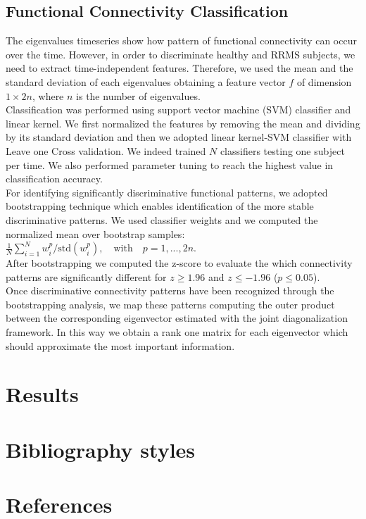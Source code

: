 \documentclass[review]{elsarticle}
\begin{document}
\subsection{Functional Connectivity Classification}
\label{class}
The eigenvalues timeseries show how pattern of functional connectivity can occur over the time. However, in order to discriminate healthy and RRMS subjects, we need to extract time-independent features. Therefore, we used the mean and the standard deviation of each eigenvalues obtaining a feature vector $f$ of dimension $1\times 2n$, where $n$ is the number of eigenvalues.\\
Classification was performed using support vector machine (SVM) classifier and linear kernel. We first normalized the features by removing the mean and dividing by its standard deviation and then we adopted linear kernel-SVM classifier with Leave one Cross validation.
We indeed trained $N$ classifiers testing one subject per time. We also performed parameter tuning to reach the highest value in classification accuracy. \\
For identifying significantly discriminative functional patterns, we adopted bootstrapping technique which enables identification of the more stable discriminative patterns. We used classifier weights and we computed the normalized mean over bootstrap samples: $\frac{1}{N} \sum_{i=1}^N w_i^p/\mbox{std}(w_i^p), \quad \mbox{with} \quad p=1,...,2n$.\\
After bootstrapping we computed the z-score to evaluate the which connectivity patterns are significantly different for $z \ge 1.96$ and $z \le -1.96$ ($p \le 0.05$).\\
Once discriminative connectivity patterns have been recognized through the bootstrapping analysis, we map these patterns computing the outer product between the corresponding eigenvector estimated with the joint diagonalization framework.
In this way we obtain a rank one matrix for each eigenvector which should approximate the most important information. 

\section{Results}





\section{Bibliography styles}



\section*{References}


\end{document}
